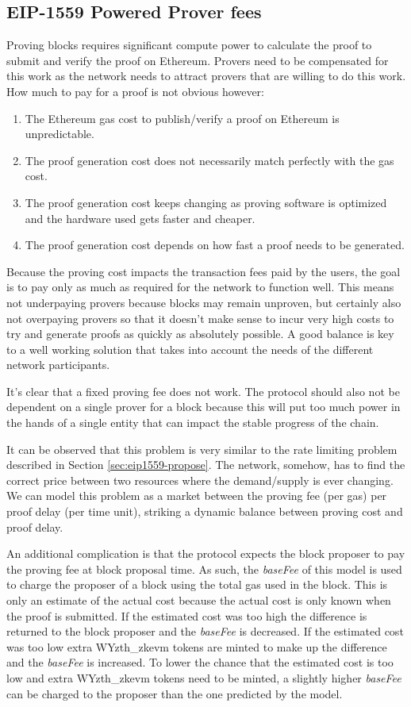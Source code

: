\documentclass[9pt,oneside]{amsart}
\begin{document}
\begin{multicols}{2}
\subsection{EIP-1559 Powered Prover fees}\label{sec:eip1559-proof}
Proving blocks requires significant compute power to calculate the proof to submit and verify the proof on Ethereum. Provers need to be compensated for this work as the network needs to attract provers that are willing to do this work. How much to pay for a proof is not obvious however:
\begin{enumerate}
\item The Ethereum gas cost to publish/verify a proof on Ethereum is unpredictable.
\item The proof generation cost does not necessarily match perfectly with the gas cost.
\item The proof generation cost keeps changing as proving software is optimized and the hardware used gets faster and cheaper.
\item The proof generation cost depends on how fast a proof needs to be generated.
\end{enumerate}

Because the proving cost impacts the transaction fees paid by the users, the goal is to pay only as much as required for the network to function well. This means not underpaying provers because blocks may remain unproven, but certainly also not overpaying provers so that it doesn't make sense to incur very high costs to try and generate proofs as quickly as absolutely possible. A good balance is key to a well working solution that takes into account the needs of the different network participants.

It's clear that a fixed proving fee does not work. The protocol should also not be dependent on a single prover for a block because this will put too much power in the hands of a single entity that can impact the stable progress of the chain. 

It can be observed that this problem is very similar to the rate limiting problem described in Section \ref{sec:eip1559-propose}. The network, somehow, has to find the correct price between two resources where the demand/supply is ever changing. We can model this problem as a market between the proving fee (per gas) per proof delay (per time unit), striking a dynamic balance between proving cost and proof delay.

An additional complication is that the protocol expects the block proposer to pay the proving fee at block proposal time. As such, the \emph{baseFee} of this model is used to charge the proposer of a block using the total gas used in the block. This is only an estimate of the actual cost because the actual cost is only known when the proof is submitted. If the estimated cost was too high the difference is returned to the block proposer and the \emph{baseFee} is decreased. If the estimated cost was too low extra WYzth_zkevm tokens are minted to make up the difference and the \emph{baseFee} is increased. To lower the chance that the estimated cost is too low and extra WYzth_zkevm tokens need to be minted, a slightly higher \emph{baseFee} can be charged to the proposer than the one predicted by the model.


\end{multicols}
\end{document}
